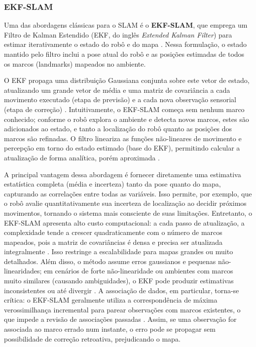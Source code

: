         \subsubsection{EKF-SLAM}
        
        Uma das abordagens clássicas para o SLAM é o \textbf{EKF-SLAM}, que emprega um Filtro de Kalman Estendido (EKF, do inglês \textit{Extended Kalman Filter}) para estimar iterativamente o estado do robô e do mapa \cite{Thrun2005}. Nessa formulação, o estado mantido pelo filtro inclui a pose atual do robô e as posições estimadas de todos os marcos (landmarks) mapeados no ambiente. 
        
        O EKF propaga uma distribuição Gaussiana conjunta sobre este vetor de estado, atualizando um grande vetor de média e uma matriz de covariância a cada movimento executado (etapa de previsão) e a cada nova observação sensorial (etapa de correção) \cite{Thrun2005}. Intuitivamente, o EKF-SLAM começa sem nenhum marco conhecido; conforme o robô explora o ambiente e detecta novos marcos, estes são adicionados ao estado, e tanto a localização do robô quanto as posições dos marcos são refinadas. O filtro lineariza as funções não-lineares de movimento e percepção em torno do estado estimado (base do EKF), permitindo calcular a atualização de forma analítica, porém aproximada \cite{Thrun2005}. 
        
        A principal vantagem dessa abordagem é fornecer diretamente uma estimativa estatística completa (média e incerteza) tanto da pose quanto do mapa, capturando as correlações entre todas as variáveis. Isso permite, por exemplo, que o robô avalie quantitativamente sua incerteza de localização ao decidir próximos movimentos, tornando o sistema mais consciente de suas limitações. Entretanto, o EKF-SLAM apresenta alto custo computacional: a cada passo de atualização, a complexidade tende a crescer quadraticamente com o número de marcos mapeados, pois a matriz de covariâncias é densa e precisa ser atualizada integralmente \cite{Thrun2005}. Isso restringe a escalabilidade para mapas grandes ou muito detalhados. Além disso, o método assume erros gaussianos e pequenas não-linearidades; em cenários de forte não-linearidade ou ambientes com marcos muito similares (causando ambiguidades), o EKF pode produzir estimativas inconsistentes ou até divergir \cite{Thrun2005}. A associação de dados, em particular, torna-se crítica: o EKF-SLAM geralmente utiliza a correspondência de máxima verossimilhança incremental para parear observações com marcos existentes, o que impede a revisão de associações passadas \cite{Thrun2005}. Assim, se uma observação for associada ao marco errado num instante, o erro pode se propagar sem possibilidade de correção retroativa, prejudicando o mapa.
        
